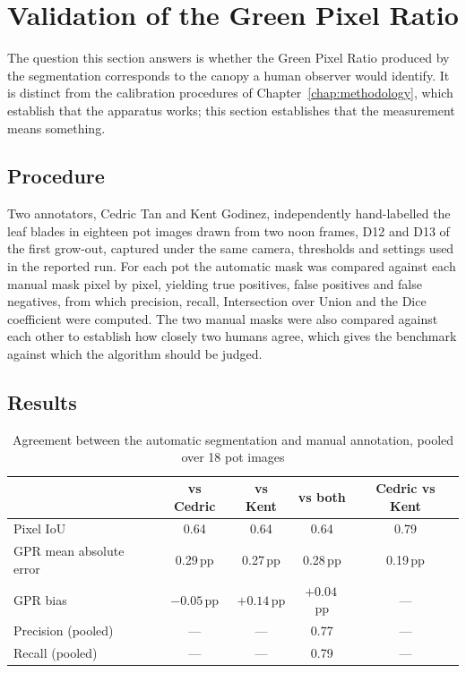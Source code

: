 \section{Validation of the Green Pixel Ratio}\label{sec:gpr_validation}

The question this section answers is whether the Green Pixel Ratio produced by
the segmentation corresponds to the canopy a human observer would identify. It
is distinct from the calibration procedures of Chapter~\ref{chap:methodology},
which establish that the apparatus works; this section establishes that the
measurement means something.

\subsection{Procedure}

Two annotators, Cedric Tan and Kent Godinez, independently hand-labelled the
leaf blades in eighteen pot images drawn from two noon frames, D12 and D13 of
the first grow-out, captured under the same camera, thresholds and settings
used in the reported run. For each pot the automatic mask was compared against
each manual mask pixel by pixel, yielding true positives, false positives and
false negatives, from which precision, recall, Intersection over Union and the
Dice coefficient were computed. The two manual masks were also compared
against each other to establish how closely two humans agree, which gives the
benchmark against which the algorithm should be judged.

\subsection{Results}

\begin{table}[ht]
\centering
\caption{Agreement between the automatic segmentation and manual annotation,
pooled over 18 pot images}
\label{tab:gpr_validation}
\begin{tabular}{lcccc}
\toprule
 & \textbf{vs Cedric} & \textbf{vs Kent} & \textbf{vs both} & \textbf{Cedric vs Kent} \\
\midrule
Pixel IoU                & 0.64 & 0.64 & 0.64 & 0.79 \\
GPR mean absolute error  & 0.29\,pp & 0.27\,pp & 0.28\,pp & 0.19\,pp \\
GPR bias                 & $-0.05$\,pp & $+0.14$\,pp & $+0.04$\,pp & --- \\
Precision (pooled)       & --- & --- & 0.77 & --- \\
Recall (pooled)          & --- & --- & 0.79 & --- \\
\bottomrule
\end{tabular}
\end{table}

